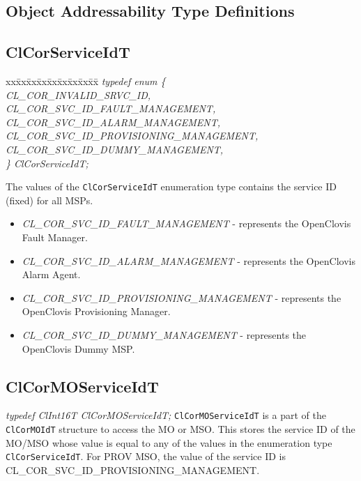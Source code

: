 \begin{flushleft}
\section{Object Addressability Type Definitions}

\subsection{ClCorServiceIdT}
\begin{tabbing}
xx\=xx\=xx\=xx\=xx\=xx\=xx\=xx\=xx\=\kill
\textit{typedef enum \{}\\
\>\>\>\>\textit{CL\_COR\_INVALID\_SRVC\_ID,}\\
\>\>\>\>\textit{CL\_COR\_SVC\_ID\_FAULT\_MANAGEMENT,}\\
\>\>\>\>\textit{CL\_COR\_SVC\_ID\_ALARM\_MANAGEMENT,}\\
\>\>\>\>\textit{CL\_COR\_SVC\_ID\_PROVISIONING\_MANAGEMENT,}\\
\>\>\>\>\textit{CL\_COR\_SVC\_ID\_DUMMY\_MANAGEMENT,}\\
\textit{\} ClCorServiceIdT;}\end{tabbing}
The values of the {\tt{ClCorServiceIdT}} enumeration type contains the service ID (fixed) for all MSPs.
\begin{itemize}
\item
\textit{CL\_\-COR\_\-SVC\_\-ID\_\-FAULT\_\-MANAGEMENT} - represents the OpenClovis Fault Manager.
\item
\textit{CL\_\-COR\_\-SVC\_\-ID\_\-ALARM\_\-MANAGEMENT} - represents the OpenClovis Alarm Agent.
\item
\textit{CL\_\-COR\_\-SVC\_\-ID\_\-PROVISIONING\_\-MANAGEMENT} - represents the OpenClovis Provisioning Manager.
\item
\textit{CL\_\-COR\_\-SVC\_\-ID\_\-DUMMY\_\-MANAGEMENT} - represents the OpenClovis Dummy MSP.
\end{itemize}




\subsection{ClCorMOServiceIdT}
\textit{typedef ClInt16T ClCorMOServiceIdT;}
\newline
\newline
{\tt{ClCorMOServiceIdT}} is a part of the {\tt{ClCorMOIdT}} structure to access the MO or MSO. This stores the service ID of the MO/MSO whose value is equal to 
any of the values in the enumeration type {\tt{ClCorServiceIdT}}. For PROV MSO, the value of the service ID is 
CL\_\-COR\_\-SVC\_\-ID\_\-PROVISIONING\_\-MANAGEMENT.



\end{flushleft}
